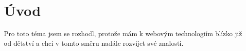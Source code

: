 \chapter{Úvod}

Pro toto téma jsem se rozhodl, protože mám k webovým technologiím blízko již od dětství a chci v tomto směru nadále rozvíjet své znalosti.